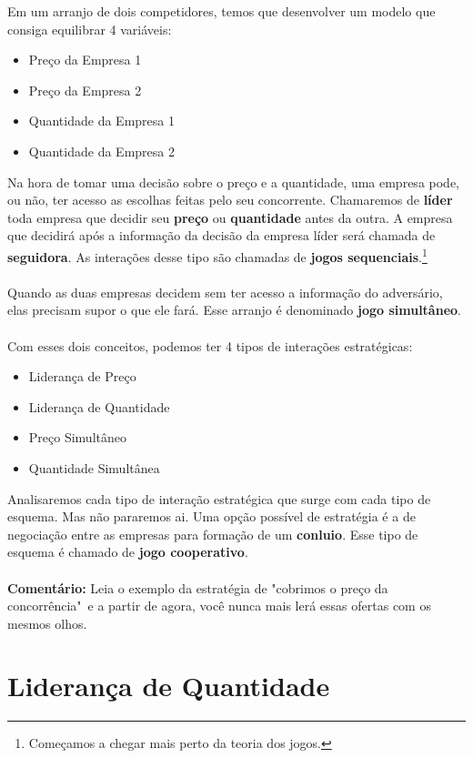 \documentclass[a4paper,11pt,oneside]{book}
\theoremstyle{definition}
\theoremstyle{break}
\begin{document}
Em um arranjo de dois competidores, temos que desenvolver um modelo que consiga equilibrar 4 variáveis:

\begin{itemize}
\item Preço da Empresa 1
\item Preço da Empresa 2
\item Quantidade da Empresa 1
\item Quantidade da Empresa 2
\end{itemize}

Na hora de tomar uma decisão sobre o preço e a quantidade, uma empresa pode, ou não, ter acesso as escolhas feitas pelo seu concorrente. Chamaremos de \textbf{líder} toda empresa que decidir seu \textbf{preço} ou \textbf{quantidade} antes da outra. A empresa que decidirá após a informação da decisão da empresa líder será chamada de \textbf{seguidora}. As interações desse tipo são chamadas de \textbf{jogos sequenciais}.\footnote{Começamos a chegar mais perto da teoria dos jogos.}
\\
\\
Quando as duas empresas decidem sem ter acesso a informação do adversário, elas precisam supor o que ele fará. Esse arranjo é denominado \textbf{jogo simultâneo}.
\\
\\
Com esses dois conceitos, podemos ter 4 tipos de interações estratégicas:

\begin{itemize}
\item Liderança de Preço
\item Liderança de Quantidade
\item Preço Simultâneo
\item Quantidade Simultânea
\end{itemize}

Analisaremos cada tipo de interação estratégica que surge com cada tipo de esquema. Mas não pararemos ai. Uma opção possível de estratégia é a de negociação entre as empresas para formação de um \textbf{conluio}. Esse tipo de esquema é chamado de \textbf{jogo cooperativo}.
\\
\\
\textbf{Comentário:} Leia o exemplo da estratégia de "cobrimos o preço da concorrência"\ e a partir de agora, você nunca mais lerá essas ofertas com os mesmos olhos.

\section{Liderança de Quantidade}
\end{document}
